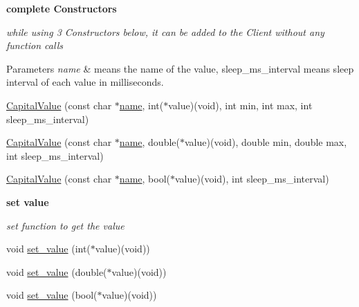 \begin{Indent}{\bf complete Constructors}\par
{\em while using 3 Constructors below, it can be added to the Client without any function calls


\begin{DoxyParams}{Parameters}
{\em name} & means the name of the value, sleep\-\_\-ms\-\_\-interval means sleep interval of each value in milliseconds. \\
\hline
\end{DoxyParams}
}\begin{DoxyCompactItemize}
\item 
\hyperlink{classCapitalValue_ae1ef3956cacd1314ae7787fe6e8e10a6}{Capital\-Value} (const char $\ast$\hyperlink{classCapitalValue_a38407e36da9c606b23b2b774b15e6c27}{name}, int($\ast$value)(void), int min, int max, int sleep\-\_\-ms\-\_\-interval)
\item 
\hyperlink{classCapitalValue_a8f4c5ef0a7e0c41289f67d12559e99e8}{Capital\-Value} (const char $\ast$\hyperlink{classCapitalValue_a38407e36da9c606b23b2b774b15e6c27}{name}, double($\ast$value)(void), double min, double max, int sleep\-\_\-ms\-\_\-interval)
\item 
\hyperlink{classCapitalValue_a5b943b70901a7d1b59712337fe5dafc6}{Capital\-Value} (const char $\ast$\hyperlink{classCapitalValue_a38407e36da9c606b23b2b774b15e6c27}{name}, bool($\ast$value)(void), int sleep\-\_\-ms\-\_\-interval)
\end{DoxyCompactItemize}
\end{Indent}
\begin{Indent}{\bf set value}\par
{\em set function to get the value }\begin{DoxyCompactItemize}
\item 
void \hyperlink{classCapitalValue_a61796b35267089bbe9e3ebfaecdd2a3b}{set\-\_\-value} (int($\ast$value)(void))
\item 
void \hyperlink{classCapitalValue_a4471b77e4df149ff9b009121f6b382d3}{set\-\_\-value} (double($\ast$value)(void))
\item 
void \hyperlink{classCapitalValue_acfb2812967adda7f1a69e9ccc5bd7e6a}{set\-\_\-value} (bool($\ast$value)(void))
\end{DoxyCompactItemize}
\end{Indent}
